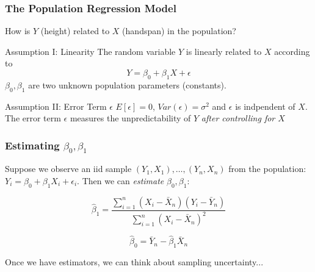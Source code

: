 \documentclass[handout]{beamer}
\begin{document}
\begin{frame}
	\frametitle{The Population Regression Model}
	How is $Y$ (height) related to $X$ (handspan) in the population?
	\begin{block}{Assumption I: Linearity}
		The random variable $Y$ is linearly related to $X$ according to 
			$$Y = \beta_0 + \beta_1 X + \epsilon$$
		$\beta_0,\beta_1$ are two unknown population parameters (constants).
	\end{block}

	\begin{block}
		{Assumption II: Error Term $\epsilon$}
		$E[\epsilon]=0$, $Var(\epsilon) = \sigma^2$ and $\epsilon$ is indpendent of $X$. The error term $\epsilon$ measures the unpredictability of $Y$ \emph{after controlling for $X$}
	\end{block}
\end{frame}
\begin{frame}
	\frametitle{Estimating $\beta_0, \beta_1$}
Suppose we observe an iid sample $(Y_1, X_1), \hdots, (Y_n, X_n)$ from the population: $Y_i = \beta_0 + \beta_1 X_i + \epsilon_i$. Then we can \emph{estimate} $\beta_0, \beta_1$:

	$$\widehat{\beta}_1 = \frac{\sum_{i=1}^n (X_i - \bar{X}_n) (Y_i - \bar{Y}_n)}{\sum_{i=1}^n (X_i - \bar{X}_n)^2}$$

	
	$$\widehat{\beta}_0 = \bar{Y}_n - \widehat{\beta}_1 \bar{X}_n$$

\vspace{2em}
	\alert{Once we have estimators, we can think about sampling uncertainty...}
\end{frame}
\end{document}
